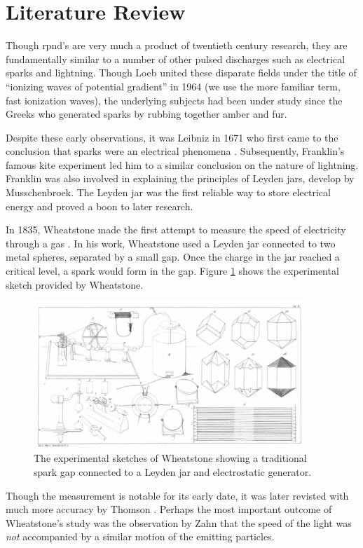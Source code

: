 \section{Literature Review}

Though \acs{rpnd}'s are very much a product of twentieth century research, they
are fundamentally similar to a number of other pulsed discharges such as
electrical sparks and lightning. Though Loeb united these disparate fields under
the title of ``ionizing waves of potential gradient'' in 1964 \cite{Loeb1965}
(we use the more familiar term, fast ionization waves), the underlying subjects
had been under study since the Greeks who generated sparks by rubbing together
amber and fur.

Despite these early observations, it was Leibniz in 1671 who first came to the
conclusion that sparks were an electrical phenomena \cite{Kryzhanovsky1989}.
Subsequently, Franklin's famous kite experiment led him to a similar conclusion
on the nature of lightning. Franklin was also involved in explaining the
principles of Leyden jars, develop by Musschenbroek. The Leyden jar was the
first reliable way to store electrical energy and proved a boon to later
research.

In 1835, Wheatstone made the first attempt to measure the speed of electricity
through a gas \cite{Wheatstone1835}. In his work, Wheatstone used a Leyden jar
connected to two metal spheres, separated by a small gap. Once the charge in the
jar reached a critical level, a spark would form in the gap. Figure
\ref{fig:wheatstone} shows the experimental sketch provided by Wheatstone.
\begin{figure}
  \centering
  \includegraphics[width=4in]{chapters/introduction/figures/wheatstone.png}
  \caption{The experimental sketches of Wheatstone showing a traditional
  spark gap connected to a Leyden jar and electrostatic
generator.}\label{fig:wheatstone}
\end{figure}
Though the measurement is notable for its early date, it was later revisted with
much more accuracy by Thomson \cite{Thomson1893}. Perhaps the most important
outcome of Wheatstone's study was the observation by Zahn \cite{Zahn1879} that
the speed of the light was \emph{not} accompanied by a similar motion of the
emitting particles.

